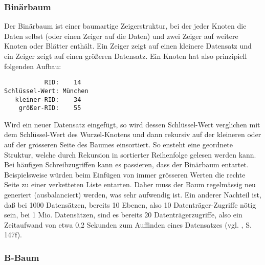 \subsubsection{Binärbaum}
Der Binärbaum ist einer baumartige Zeigerstruktur, bei der jeder Knoten die Daten selbst (oder einen Zeiger auf die Daten) und zwei Zeiger auf weitere Knoten oder Blätter enthält. Ein Zeiger zeigt auf einen kleinere Datensatz und ein Zeiger zeigt auf einen größeren Datensatz. Ein Knoten hat also prinzipiell folgenden Aufbau:
\begin{lstlisting}
           RID:    14
Schlüssel-Wert: München
   kleiner-RID:    34
    größer-RID:    55
\end{lstlisting}
Wird ein neuer Datensatz eingefügt, so wird dessen Schlüssel-Wert verglichen mit dem Schlüssel-Wert des Wurzel-Knotens und dann rekursiv auf der kleineren oder auf der grösseren Seite des Baumes einsortiert. So ensteht eine geordnete Struktur, welche durch Rekursion in sortierter Reihenfolge gelesen werden kann. Bei häufigen Schreibzugriffen kann es passieren, dass der Binärbaum entartet. Beispielsweise würden beim Einfügen von immer grösseren Werten die rechte Seite zu einer verketteten Liste entarten. Daher muss der Baum regelmässig neu generiert (ausbalanciert) werden, was sehr aufwendig ist. Ein anderer Nachteil ist, daß bei 1000 Datensätzen, bereits 10 Ebenen, also 10 Datenträger-Zugriffe nötig sein, bei 1 Mio. Datensätzen, sind es bereits 20 Datenträgerzugriffe, also ein Zeitaufwand von etwa 0,2 Sekunden zum Auffinden eines Datensatzes (vgl. \cite{Sauer1998}, S. 147f).
\subsubsection{B-Baum}
